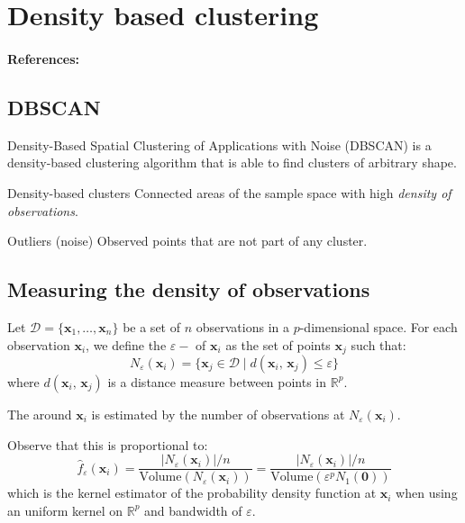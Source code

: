 \pagebreak
\section{Density based clustering}
\paragraph{References:} \cite{ester_density-based_1996}
\subsection{DBSCAN}

Density-Based Spatial Clustering of Applications with Noise (DBSCAN) is
a density-based clustering algorithm that is able to find clusters of
arbitrary shape.

\begin{definition}{Density-based clusters}{}
	Connected areas of the sample space with high \emph{density of observations}.
\end{definition}

\begin{definition}{Outliers (noise)}{}
	Observed points that are not part of any cluster.
\end{definition}

\subsection{Measuring the density of observations}
Let $\mathcal{D} = \{ \boldsymbol{x}_1, \ldots, \boldsymbol{x}_n \}$ be a set of $n$ observations
in a $p$-dimensional space. For each observation $\boldsymbol{x}_i$, we define the $\varepsilon-$
of $\boldsymbol{x}_i$ as the set of points $\boldsymbol{x}_j$ such that:
\begin{equation*}
    N_{\varepsilon}(\boldsymbol{x}_i) = \bigl\{
    \boldsymbol{x}_j \in \mathcal{D} \mid d(\boldsymbol{x}_i,\,\boldsymbol{x}_j) \leq \varepsilon
    \bigr\}
\end{equation*}
where $d(\boldsymbol{x}_i,\,\boldsymbol{x}_j)$ is a distance measure between points in $\mathds{R}^p$.

The  around $\boldsymbol{x}_i$ is estimated by the number
of observations at $N_{\varepsilon}(\boldsymbol{x}_i)$.

Observe that this is proportional to:
\begin{equation*}
    \hat{f}_\varepsilon(\boldsymbol{x}_i) =
    \frac{|N_{\varepsilon}(\boldsymbol{x}_i)| / n}{\text{Volume}(N_{\varepsilon}(\boldsymbol{x}_i))}
    = \frac{|N_{\varepsilon}(\boldsymbol{x}_i)| / n}{\text{Volume}(\varepsilon^p N_{1}(\boldsymbol{0}))}
\end{equation*}
which is the kernel estimator of the probability density function at $\boldsymbol{x}_i$
when using an uniform kernel on $\mathds{R}^p$ and bandwidth of $\varepsilon$.

